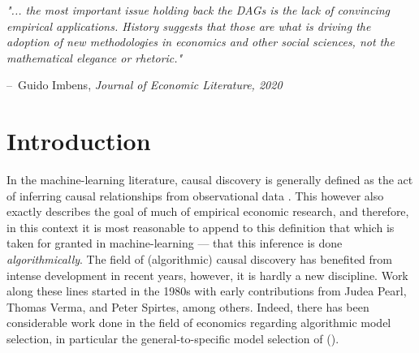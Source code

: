 \documentclass{article}
\makeatletter
\newenvironment{chapquote}[2][2em]
  {\setlength{\@tempdima}{#1}%
   \def\chapquote@author{#2}%
   \parshape 1 \@tempdima \dimexpr\textwidth-2\@tempdima\relax%
   \itshape}
  {\par\normalfont\hfill--\ \chapquote@author\hspace*{\@tempdima}\par\bigskip}
\makeatother
\begin{document}

\newpage

\tableofcontents

\newpage

\maketitle


\vspace{1cm}


\begin{chapquote}{Guido Imbens, \textit{Journal of Economic Literature, 2020}}
  "... the most important issue holding back the DAGs is the lack of convincing empirical applications. History suggests that those are what is driving the adoption of new methodologies in economics and other social sciences,  not the mathematical elegance or rhetoric."
\end{chapquote}

\section{Introduction}

In the machine-learning literature, causal discovery is generally defined as the act of inferring causal relationships from observational data \parencite{huang2020causal}. This however also exactly describes the goal of much of empirical economic research, and therefore, in this context it is most reasonable to append to this definition that which is taken for granted in machine-learning --- that this inference is done \textit{algorithmically}. The field of (algorithmic) causal discovery has benefited from intense development in recent years, however, it is hardly a new discipline. Work along these lines started in the 1980s with early contributions from Judea Pearl, Thomas Verma, and Peter Spirtes, among others. Indeed, there has been considerable work done in the field of economics regarding algorithmic model selection, in particular the general-to-specific model selection of \citeauthor{krolzig2001computer} (\citeyear{krolzig2001computer}).
\end{document}

